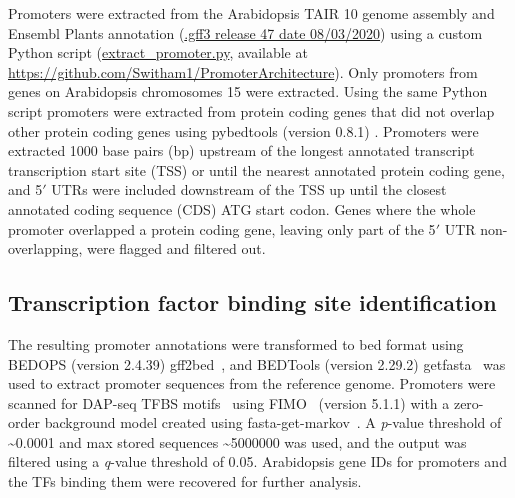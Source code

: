 \documentclass[../main.tex]{subfiles}
\begin{document}
Promoters were extracted from the Arabidopsis TAIR 10 \autocite{lameschArabidopsisInformationResource2012} genome assembly and Ensembl Plants \autocite{howeEnsemblGenomes20202020} annotation (\href{ftp://ftp.ensemblgenomes.org/pub/release-47/plants/gff3/arabidopsis_thaliana/}{.gff3 release 47 date 08/03/2020}) using a custom Python script (\href{https://github.com/Switham1/PromoterArchitecture/blob/master/src/data_sorting/extract_promoter.py}{extract\_promoter.py}, available at \url{https://github.com/Switham1/PromoterArchitecture}).
Only promoters from genes on Arabidopsis chromosomes 1\textendash{}5 were extracted.
Using the same Python script promoters were extracted from protein coding genes that did not overlap other protein coding genes using pybedtools (version 0.8.1) \autocite{dalePybedtoolsFlexiblePython2011}.
Promoters were extracted 1000 base pairs (bp) upstream of the longest annotated transcript transcription start site (TSS) or until the nearest annotated protein coding gene, and 5$\prime$ UTRs were included downstream of the TSS up until the closest annotated coding sequence (CDS) ATG start codon.
Genes where the whole promoter overlapped a protein coding gene, leaving only part of the 5$\prime$ UTR non-overlapping, were flagged and filtered out.

\subsection{Transcription factor binding site identification}\label{chapter2:methods:transcription-factor-binding-site-identification}

The resulting promoter annotations were transformed to bed format using BEDOPS (version 2.4.39) gff2bed~\autocite{nephBEDOPSHighperformanceGenomic2012}, and BEDTools (version 2.29.2) getfasta~\autocite{quinlanBEDToolsFlexibleSuite2010} was used to extract promoter sequences from the reference genome.
Promoters were scanned for DAP\hyp{}seq TFBS motifs~\autocite{omalleyCistromeEpicistromeFeatures2016} using FIMO~\autocite{grantFIMOScanningOccurrences2011} (version 5.1.1) with a zero\hyp{}order background model created using fasta\hyp{}get\hyp{}markov~\autocite{baileyMEMESuiteTools2009}.
A \textit{p}\hyp{}value threshold of \textasciitilde{}0.0001 and max stored sequences \textasciitilde{}5000000 was used, and the output was filtered using a \textit{q}\hyp{}value threshold of 0.05.
Arabidopsis gene IDs for promoters and the TFs binding them were recovered for further analysis.
\end{document}
